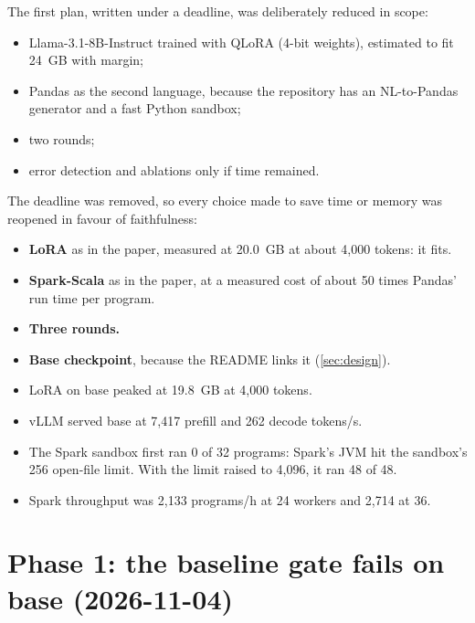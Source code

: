 \begin{description}[style=nextline,leftmargin=1.2em]
\item[Plan.] The first plan, written under a deadline, was deliberately reduced in scope:
  \begin{itemize}
  \item Llama-3.1-8B-Instruct trained with QLoRA (4-bit weights), estimated to fit 24~GB with margin;
  \item Pandas as the second language, because the repository has an NL-to-Pandas generator and a fast Python sandbox;
  \item two rounds;
  \item error detection and ablations only if time remained.
  \end{itemize}
\item[Reversal (2026-11-04).] The deadline was removed, so every choice made to save time or memory was reopened in
favour of faithfulness:
  \begin{itemize}
  \item \textbf{LoRA} as in the paper, measured at 20.0~GB at about 4,000 tokens: it fits.
  \item \textbf{Spark-Scala} as in the paper, at a measured cost of about 50 times Pandas' run time per program.
  \item \textbf{Three rounds.}
  \item \textbf{Base checkpoint}, because the README links it (\cref{sec:design}).
  \end{itemize}
\item[Environment results.]
  \begin{itemize}
  \item LoRA on base peaked at 19.8~GB at 4,000 tokens.
  \item vLLM served base at 7,417 prefill and 262 decode tokens/s.
  \item The Spark sandbox first ran 0 of 32 programs: Spark's JVM hit the sandbox's 256 open-file limit. With the limit
  raised to 4,096, it ran 48 of 48.
  \item Spark throughput was 2,133 programs/h at 24 workers and 2,714 at 36.
  \end{itemize}
\end{description}

\section{Phase 1: the baseline gate fails on base (2026-11-04)}\label{sec:hist-gate}

